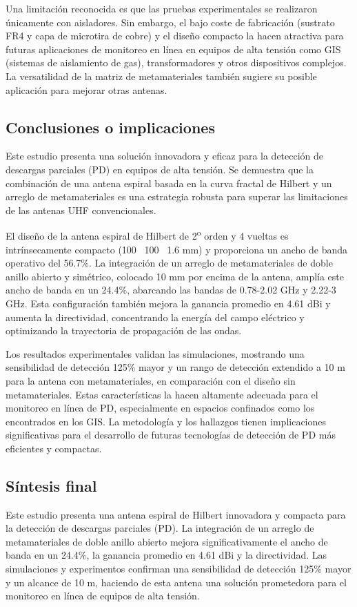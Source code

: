 Una limitación reconocida es que las pruebas experimentales se realizaron únicamente con aisladores. Sin embargo, el bajo coste de fabricación (sustrato FR4 y capa de microtira de cobre) y el diseño compacto la hacen atractiva para futuras aplicaciones de monitoreo en línea en equipos de alta tensión como GIS (sistemas de aislamiento de gas), transformadores y otros dispositivos complejos. La versatilidad de la matriz de metamateriales también sugiere su posible aplicación para mejorar otras antenas.

\subsection*{Conclusiones o implicaciones}
Este estudio presenta una solución innovadora y eficaz para la detección de descargas parciales (PD) en equipos de alta tensión. Se demuestra que la combinación de una antena espiral basada en la curva fractal de Hilbert y un arreglo de metamateriales es una estrategia robusta para superar las limitaciones de las antenas UHF convencionales.

El diseño de la antena espiral de Hilbert de 2\textsuperscript{o} orden y 4 vueltas es intrínsecamente compacto (100 \texttimes\ 100 \texttimes\ 1.6 mm) y proporciona un ancho de banda operativo del 56.7\%. La integración de un arreglo de metamateriales de doble anillo abierto y simétrico, colocado 10 mm por encima de la antena, amplía este ancho de banda en un 24.4\%, abarcando las bandas de 0.78-2.02 GHz y 2.22-3 GHz. Esta configuración también mejora la ganancia promedio en 4.61 dBi y aumenta la directividad, concentrando la energía del campo eléctrico y optimizando la trayectoria de propagación de las ondas.

Los resultados experimentales validan las simulaciones, mostrando una sensibilidad de detección 125\% mayor y un rango de detección extendido a 10 m para la antena con metamateriales, en comparación con el diseño sin metamateriales. Estas características la hacen altamente adecuada para el monitoreo en línea de PD, especialmente en espacios confinados como los encontrados en los GIS. La metodología y los hallazgos tienen implicaciones significativas para el desarrollo de futuras tecnologías de detección de PD más eficientes y compactas.

\subsection*{Síntesis final}
Este estudio presenta una antena espiral de Hilbert innovadora y compacta para la detección de descargas parciales (PD). La integración de un arreglo de metamateriales de doble anillo abierto mejora significativamente el ancho de banda en un 24.4\%, la ganancia promedio en 4.61 dBi y la directividad. Las simulaciones y experimentos confirman una sensibilidad de detección 125\% mayor y un alcance de 10 m, haciendo de esta antena una solución prometedora para el monitoreo en línea de equipos de alta tensión.